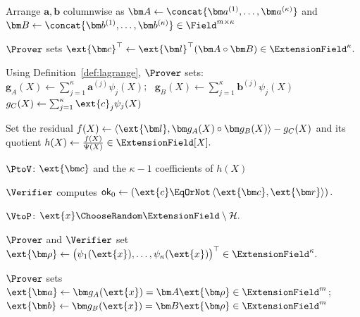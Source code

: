 \begin{algorithm}[!t]
\caption{Packed Hadamard-product proof}
\label{alg:hadamard}

Arrange \(\bm a,\bm b\) columnwise as
\(\bm A\leftarrow\concat{\bm a^{(1)},\ldots,\bm a^{(\kappa)}}\)
and \(\bm B\leftarrow\concat{\bm b^{(1)},\ldots,\bm b^{(\kappa)}}
\in\Field^{m\times\kappa}\)\;

\(\Prover\) sets
\(
    \ext{\bm c}^{\top}
    \leftarrow
    \ext{\bm l}^{\top}
    (\bm A\circ\bm B)
    \in\ExtensionField^\kappa.
\)

Using Definition~\ref{def:lagrange}, \(\Prover\) sets:\\
\Indp
\(    \bm g_A(X)
    \leftarrow
    \sum_{j=1}^{\kappa}
    \bm a^{(j)}\psi_j(X)
\);~
\(
    \bm g_B(X)
    \leftarrow
    \sum_{j=1}^{\kappa}
    \bm b^{(j)}\psi_j(X)
\)\;
\(
    g_C(X)
    \leftarrow
    \sum_{j=1}^{\kappa}
    \ext{c}_j\psi_j(X)
\)\;

Set the residual
\(
    f(X)
    \leftarrow
    \left\langle
        \ext{\bm l},
        \bm g_A(X)\circ\bm g_B(X)
    \right\rangle
    -
    g_C(X)
\)
and its quotient
\(
    h(X)
    \leftarrow
    \frac{f(X)}{\Psi(X)}
    \in\ExtensionField[X].
\)
\Indm

\(\PtoV\):
\(\ext{\bm c}\) and the \(\kappa-1\) coefficients of \(h(X)\)\;

\(\Verifier\) computes
\(
    \mathsf{ok}_0
    \leftarrow
    \left(
        \ext{c}
        \EqOrNot
        \left\langle
            \ext{\bm c},\ext{\bm r}
        \right\rangle
    \right).
\)

\(\VtoP\):
\(
    \ext{x}
    \ChooseRandom
    \ExtensionField\setminus\mathcal H.
\)

\(\Prover\) and \(\Verifier\) set
\(
    \ext{\bm\rho}
    \leftarrow
    \bigl(
        \psi_1(\ext{x}),
        \ldots,
        \psi_\kappa(\ext{x})
    \bigr)^\top
    \in\ExtensionField^\kappa.
\)

\(\Prover\) sets
\(
    \ext{\bm a}
    \leftarrow
    \bm g_A(\ext{x})
    =
    \bm A\ext{\bm\rho}
    \in\ExtensionField^m
\);~
\(
    \ext{\bm b}
    \leftarrow
    \bm g_B(\ext{x})
    =
    \bm B\ext{\bm\rho}
    \in\ExtensionField^m
\)\;


\end{algorithm}

